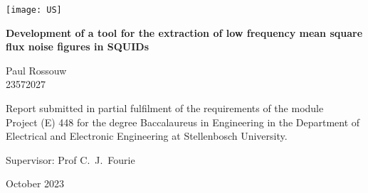 \graphicspath{{frontmatter/fig/}}

\begin{titlepage}
	\begin{center}
		
		\texttt{[image: US]}
		
		\vfill
		
		{\sffamily \bfseries \huge Development of a tool for the extraction of low frequency mean square flux noise figures in SQUIDs \par}
		
		\vfill
		
		{\large {\Large Paul Rossouw} \\ 23572027 \par}
		
		\vfill
		
		\vfill
		
		{Report submitted in partial fulfilment of the requirements of the module \\
			Project (E) 448 for the degree Baccalaureus in Engineering in the Department of
			Electrical and Electronic Engineering at Stellenbosch University. \par}
		
		\vfill
		
		{\large {Supervisor}: Prof C.\ J.\ Fourie} %
		
		\vfill
		
		{\Large October 2023}
	\end{center}
\end{titlepage}
